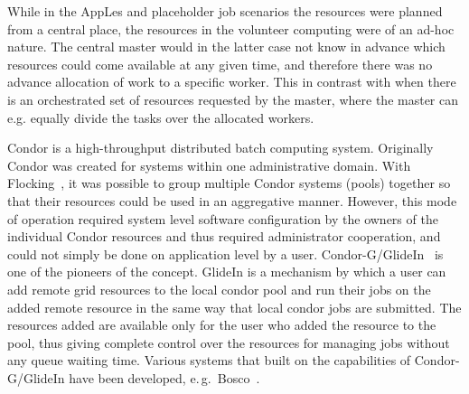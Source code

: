 \documentclass{sig-alternate}
\begin{document}
While in the AppLes and placeholder job scenarios the resources were planned
from a central place, the resources in the volunteer computing were of an
ad-hoc nature. The central master would in the latter case not know in advance
which resources could come available at any given time, and therefore there was
no advance allocation of work to a specific worker. This in contrast with when
there is an orchestrated set of resources requested by the master, where the
master can e.g. equally divide the tasks over the allocated workers.

Condor is a high-throughput distributed batch computing system. Originally
Condor was created for systems within one administrative domain. With
Flocking~\cite{Epema:1996:flocking}, it was possible to group multiple Condor
systems (pools) together so that their resources could be used in an
aggregative manner. However, this mode of operation required system level
software configuration by the owners of the individual Condor resources and
thus required administrator cooperation, and could not simply be done on
application level by a user. Condor-G/GlideIn~\cite{condor-g} is one of the
pioneers of the \pilotjob concept. GlideIn is a mechanism by which a user can
add remote grid resources to the local condor pool and run their jobs on the
added remote resource in the same way that local condor jobs are submitted.
The resources added are available only for the user who added the resource to
the pool, thus giving complete control over the resources for managing jobs
without any queue waiting time.
Various systems that built on the \pilot capabilities of Condor-G/GlideIn have
been developed, e.\,g.\ Bosco~\cite{bosco}.


\end{document}

